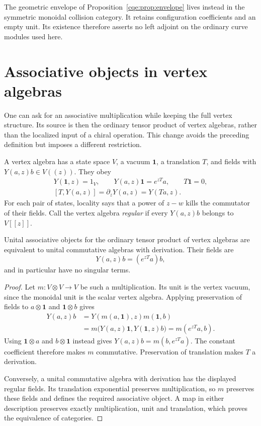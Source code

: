The geometric envelope of Proposition~\ref{cqe:prop:envelope}
lives instead in the symmetric monoidal collision category.
It retains configuration coefficients and an empty unit.
Its existence therefore asserts no left adjoint on the
ordinary curve modules used here.

\section{Associative objects in vertex algebras}
\label{e1f:sec:va}

One can ask for an associative multiplication while keeping
the full vertex structure. Its source is then the ordinary
tensor product of vertex algebras, rather than the localized
input of a chiral operation. This change avoids the preceding
definition but imposes a different restriction.

\label{e1f:def:regular-vertex-algebra}A vertex algebra has a state space \(V\), a vacuum
\(\mathbf1\), a translation \(T\), and fields with
\(Y(a,z)b\in V((z))\). They obey
\[
 \begin{gathered}
 Y(\mathbf1,z)=1_V,\qquad Y(a,z)\mathbf1=e^{zT}a,
 \qquad T\mathbf1=0,\\
 [T,Y(a,z)]=\partial_zY(a,z)=Y(Ta,z).
 \end{gathered}
\]
For each pair of states, locality says that a power of
\(z-w\) kills the commutator of their fields. Call the vertex
algebra \emph{regular} if every \(Y(a,z)b\) belongs to
\(V[[z]]\).

\begin{theorem}\label{e1f:thm:va}
Unital associative objects for the ordinary tensor product
of vertex algebras are equivalent to unital commutative
algebras with derivation. Their fields are
\[
 Y(a,z)b=(e^{zT}a)b,
\]
and in particular have no singular terms.
\end{theorem}

\begin{proof}
Let \(m:V\otimes V\to V\) be such a multiplication.
Its unit is the vertex vacuum, since the monoidal unit is
the scalar vertex algebra. Applying preservation of fields
to \(a\otimes\mathbf1\) and \(\mathbf1\otimes b\) gives
\[
 \begin{aligned}
 Y(a,z)b
 &=Y(m(a,\mathbf1),z)m(\mathbf1,b)\\
 &=m\bigl(Y(a,z)\mathbf1,Y(\mathbf1,z)b\bigr)
  =m(e^{zT}a,b).
 \end{aligned}
\]
Using \(\mathbf1\otimes a\) and \(b\otimes\mathbf1\)
instead gives \(Y(a,z)b=m(b,e^{zT}a)\). The constant
coefficient therefore makes \(m\) commutative.
Preservation of translation makes \(T\) a derivation.

Conversely, a unital commutative algebra with derivation has
the displayed regular fields. Its translation exponential
preserves multiplication, so \(m\) preserves these fields
and defines the required associative object. A map in either
description preserves exactly multiplication, unit and
translation, which proves the equivalence of categories.
\end{proof}

